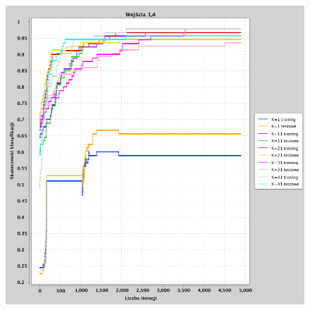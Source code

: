 \documentclass[a4paper, portrait,11pt]{article}
\begin{document}
\begin{figure}[!htb]
\begin{minipage}{0.33\textwidth}
    \caption{\label{fig:41_2_1,3}}
  \end{minipage}
  \begin{minipage}{0.33\textwidth}
    \centering
    \includegraphics[width=1\linewidth]{../data/classification4/1/2_1,4.png}
    \caption{\label{fig:41_2_1,4}}
  \end{minipage}\hfill
\end{figure}
\end{document}
